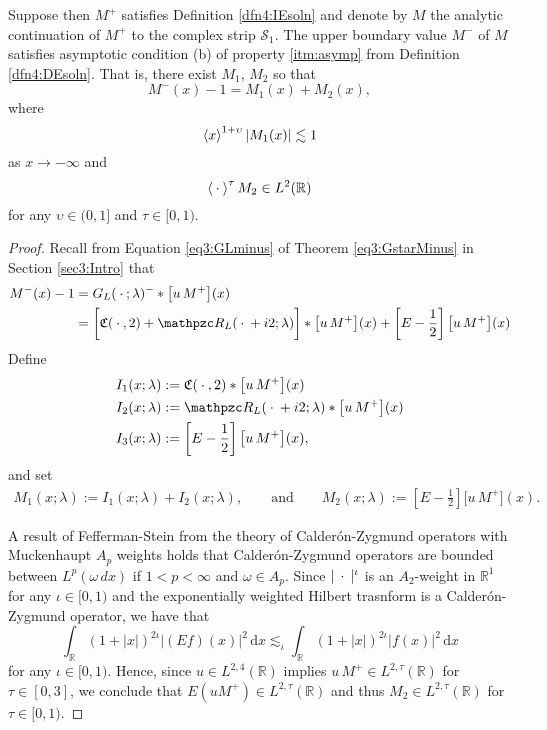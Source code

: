 \documentclass[../dissertation.tex]{subfiles}
\begin{document}
\begin{lma}\label{lma4:upperasymp}
	Suppose then $M^+$ satisfies Definition \ref{dfn4:IEsoln} and denote by $M$
	the analytic continuation of $M^+$ to the complex strip $\mathcal S_1$. The 
	upper boundary value $M^-$ of $M$ satisfies asymptotic condition (b) of 
	property \ref{itm:asymp} from Definition \ref{dfn4:DEsoln}. That is, there 
	exist $M_1$, $M_2$ so that 
	\[
		M^-(x) -1 = M_1(x) + M_2(x), 
	\]
	where 
	\[
		\left\langle x \right\rangle^{1+\upsilon} | M_1(x) | \lesssim 1
	\]
	as $x\to -\infty$ and 
	\[
		\left\langle \kern 0.5ex \cdot \kern 0.5ex \right\rangle^\tau M_2 \in L^2(\mathbb R)
	\]
	for any $\upsilon \in (0,1]$ and $\tau \in [0,1)$.
\end{lma}
\begin{proof}
	Recall from Equation \eqref{eq3:GLminus} of Theorem \ref{eq3:GstarMinus} in 
	Section \ref{sec3:Intro} that 
	\begin{align*}
		M^-(x) - 1
			&= G_L(\dotarg; \lambda)^- * \big[u\,M^+\big](x) \\
			&= 
				\bigg[
					\mathfrak C(\dotarg, 2) + \mathpzc R_L(\dotarg+i2; \lambda)
				\bigg] 
				* 
				\big[u\,M^+\big](x)
				+
				\left[E - \frac{1}{2}\right]\big[u\,M^+\big](x)
	\end{align*}
	Define
	\begin{align*}
		I_1(x;\lambda) &:= \mathfrak C(\dotarg, 2) * \big[u\,M^+\big](x) \\
		I_2(x;\lambda) &:= \mathpzc R_L(\dotarg+i2; \lambda) * \big[u\,M^+\big](x) \\
		I_3(x;\lambda) &:= \left[E - \frac{1}{2}\right]\big[u\,M^+\big](x),
	\end{align*}
	and set
	\begin{align*}
		M_1(x;\lambda) :=  I_1(x;\lambda) + I_2(x;\lambda),
			\qquad\text{and}\qquad
		M_2(x;\lambda) := \left[E - \frac{1}{2}\right]\big[u\,M^+\big](x).
	\end{align*}
	
	A result of Fefferman-Stein from the theory of Calder\'on-Zygmund operators
	with Muckenhaupt $A_p$ weights holds that Calder\'on-Zygmund operators are 
	bounded between $L^p(\omega \,dx)$ if $1 < p < \infty $ and $\omega \in A_p$.
	Since $|\kern 0.5ex \cdot \kern 0.5ex|^\iota$ is an $A_2$-weight in $\mathbb R^1$ for any 
	$\iota\in [0, 1)$ and the exponentially weighted Hilbert trasnform is a 
	Calder\'on-Zygmund operator, we have that
	\[
		\int_{\mathbb R} (1+|x|)^{2\iota} \left|(Ef)(x)\right|^2 \, \mathrm{d}x
			\lesssim_{\iota} 
				\int_{\mathbb R}(1+|x|)^{2\iota} |f(x)|^2 \, \mathrm{d}x
	\]
	for any $\iota \in [0, 1)$. Hence, since $u\in L^{2,4}(\mathbb R)$ implies 
	$u\,M^+ \in L^{2,\tau}(\mathbb R)$ for $\tau \in [0, 3]$, we conclude
	that $E(uM^+) \in L^{2, \tau}(\mathbb R)$ and thus $M_2 \in L^{2,\tau}(\mathbb R)$
	for $\tau \in [0, 1)$.


\end{proof}
\end{document}
